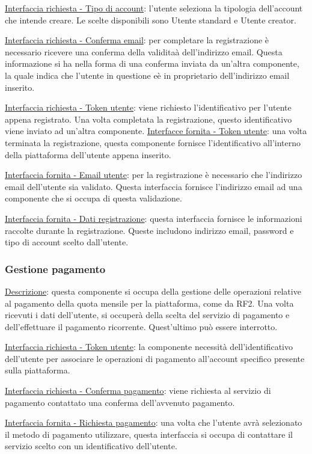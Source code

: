 \documentclass[a4paper,12pt]{article}
\begin{document}
\underline{Interfaccia richiesta - Tipo di account}: l’utente seleziona la tipologia dell’account che intende creare. Le scelte disponibili sono Utente standard e Utente creator.

\underline{Interfaccia richiesta - Conferma email}: per completare la registrazione è necessario ricevere una conferma della validitaà dell'indirizzo email. Questa informazione si ha nella forma di una conferma inviata da un'altra componente, la quale indica che l’utente in questione eè in proprietario dell'indirizzo email inserito.

\underline{Interfaccia richiesta - Token utente}: viene richiesto l’identificativo per l’utente appena registrato. Una volta completata la registrazione, questo identificativo viene inviato ad un’altra componente.
\underline{Interfacce fornita - Token utente}: una volta terminata la registrazione, questa componente fornisce l’identificativo all’interno della piattaforma dell’utente appena inserito.

\underline{Interfaccia fornita - Email utente}: per la registrazione è necessario che l’indirizzo email dell’utente sia validato. Questa interfaccia fornisce l’indirizzo email ad una componente che si occupa di questa validazione.

\underline{Interfaccia fornita - Dati registrazione}: questa interfaccia fornisce le informazioni raccolte durante la registrazione. Queste includono indirizzo email, password e tipo di account scelto dall’utente.

\subsubsection{Gestione pagamento}

\underline{Descrizione}: questa componente si occupa della gestione delle operazioni relative al pagamento della quota mensile per la piattaforma, come da RF2. Una volta ricevuti i dati dell’utente, si occuperà della scelta del servizio di pagamento e dell’effettuare il pagamento ricorrente. Quest’ultimo può essere interrotto.

\underline{Interfaccia richiesta - Token utente}: la componente necessità dell’identificativo dell’utente per associare le operazioni di pagamento all’account specifico presente sulla piattaforma. 

\underline{Interfaccia richiesta - Conferma pagamento}: viene richiesta al servizio di pagamento contattato una conferma dell’avvenuto pagamento.

\underline{Interfaccia fornita - Richiesta pagamento}: una volta che l’utente avrà selezionato il metodo di pagamento utilizzare, questa interfaccia si occupa di contattare il servizio scelto con un identificativo dell’utente.
\end{document}
